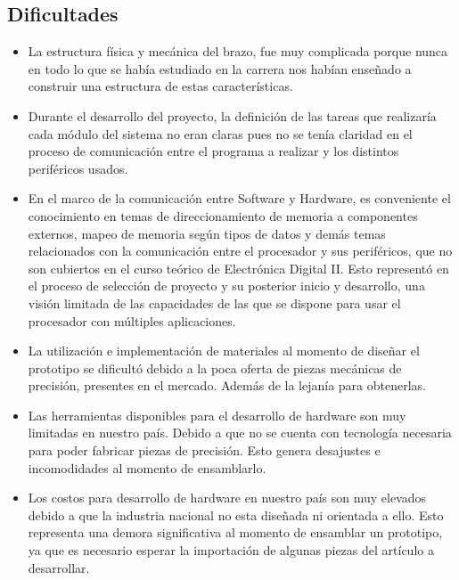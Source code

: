 \documentclass[twocolumn]{IEEEtran}
\begin{document}
\subsection{Dificultades}
\begin{itemize}
 \item La estructura física y mecánica del brazo, fue muy complicada porque nunca en todo lo que se había estudiado en la carrera nos habían enseñado a construir una estructura de estas características.
  \item Durante el desarrollo del proyecto, la definición de las tareas que realizaría cada módulo del sistema no eran claras pues no se tenía claridad en el proceso de comunicación entre el programa a realizar y los distintos periféricos usados.
 \item En el marco de la comunicación entre Software y Hardware, es conveniente el conocimiento en  temas de direccionamiento de memoria a componentes externos, mapeo de memoria según tipos de datos y demás temas relacionados con la comunicación entre el procesador y sus periféricos, que no son cubiertos en el curso teórico de Electrónica Digital II. Esto representó en el proceso de selección de proyecto y su posterior inicio y desarrollo, una visión limitada de las capacidades de las que se dispone para usar el procesador con múltiples aplicaciones. 
 \item La utilización e implementación de materiales al momento de diseñar el prototipo se dificultó debido a la poca oferta de piezas mecánicas de precisión, presentes en el mercado. Además de la lejanía para obtenerlas.
 \item Las herramientas disponibles para el desarrollo de hardware son muy limitadas en nuestro país. Debido a que no se cuenta con tecnología necesaria para poder fabricar piezas de precisión. Esto genera desajustes e incomodidades al momento de ensamblarlo.
 \item Los costos para desarrollo de hardware en nuestro país son muy elevados debido a que la industria nacional no esta diseñada ni orientada a ello. Esto representa una demora significativa al momento de ensamblar un prototipo, ya que es necesario esperar la importación de algunas piezas del artículo a desarrollar.
\end{itemize}
\end{document}
